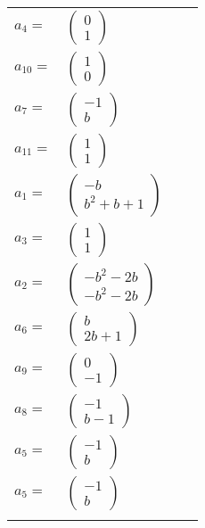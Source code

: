 \documentclass[1p]{elsarticle_modified}
\theoremstyle{definition}
\begin{document}
\begin{tabular}{m{7pt} m{180pt} m{7pt} m{180pt} }
\flushright $a_{4}=$&$\begin{pmatrix}0\\1\end{pmatrix}$ \\
\flushright $a_{10}=$&$\begin{pmatrix}1\\0\end{pmatrix}$ \\
\flushright $a_{7}=$&$\begin{pmatrix}-1\\b\end{pmatrix}$ \\
\flushright $a_{11}=$&$\begin{pmatrix}1\\1\end{pmatrix}$ \\
\flushright $a_{1}=$&$\begin{pmatrix}- b\\b^2+b+1\end{pmatrix}$ \\
\flushright $a_{3}=$&$\begin{pmatrix}1\\1\end{pmatrix}$ \\
\flushright $a_{2}=$&$\begin{pmatrix}- b^2-2 b\\- b^2-2 b\end{pmatrix}$ \\
\flushright $a_{6}=$&$\begin{pmatrix}b\\2 b+1\end{pmatrix}$ \\
\flushright $a_{9}=$&$\begin{pmatrix}0\\-1\end{pmatrix}$ \\
\flushright $a_{8}=$&$\begin{pmatrix}-1\\b-1\end{pmatrix}$ \\
\flushright $a_{5}=$&$\begin{pmatrix}-1\\b\end{pmatrix}$\\ \flushright $a_{5}=$&$\begin{pmatrix}-1\\b\end{pmatrix}$\\&\end{tabular}
\end{document}
